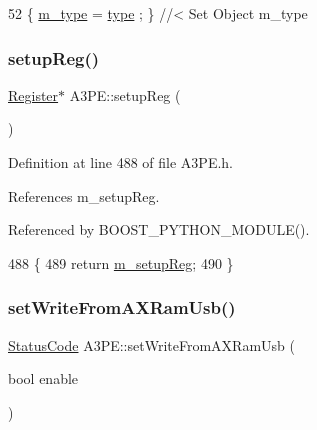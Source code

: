 \begin{DoxyCode}
52 \{ \hyperlink{classObject_a457a600fe8c00eb1034374f75110a78c}{m\_type}  = \hyperlink{classObject_a84f99f70f144a83e1582d1d0f84e4e62}{type}  ; \} \textcolor{comment}{//< Set Object m\_type}
\end{DoxyCode}
\mbox{\label{classA3PE_a94d96383e441153ed01e82cc12d2f593}} 
\subsubsection{\texorpdfstring{setup\+Reg()}{setupReg()}}
{\footnotesize\ttfamily \hyperlink{classRegister}{Register}$\ast$ A3\+P\+E\+::setup\+Reg (\begin{DoxyParamCaption}{ }\end{DoxyParamCaption})\hspace{0.3cm}{\ttfamily [inline]}}



Definition at line 488 of file A3\+P\+E.\+h.



References m\+\_\+setup\+Reg.



Referenced by B\+O\+O\+S\+T\+\_\+\+P\+Y\+T\+H\+O\+N\+\_\+\+M\+O\+D\+U\+L\+E().


\begin{DoxyCode}
488                       \{
489     \textcolor{keywordflow}{return} \hyperlink{classA3PE_a142fa10b7e705c4701ae21678ec2ec8a}{m\_setupReg};
490   \}
\end{DoxyCode}
\mbox{\label{classA3PE_aeb276fae7f19c45b4b4a3a5a2b99c337}} 
\subsubsection{\texorpdfstring{set\+Write\+From\+A\+X\+Ram\+Usb()}{setWriteFromAXRamUsb()}}
{\footnotesize\ttfamily \hyperlink{classStatusCode}{Status\+Code} A3\+P\+E\+::set\+Write\+From\+A\+X\+Ram\+Usb (\begin{DoxyParamCaption}\item[{bool}]{enable }\end{DoxyParamCaption})}



